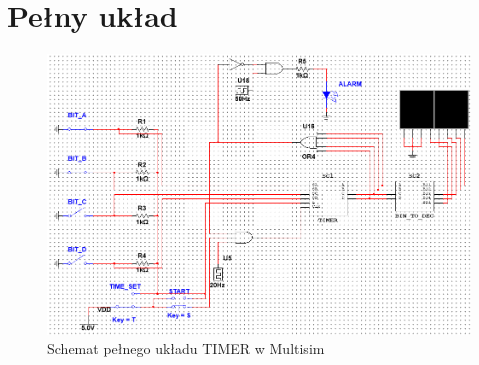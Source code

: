 \documentclass{article}
\begin{document}
    \section{Pełny układ}
    \begin{figure}[H]
        \centering
        \captionsetup{font=small, skip=2pt}
        \includegraphics[scale=0.7]{images/pelny_timer}
        \caption{Schemat pełnego układu TIMER w Multisim}
    \end{figure}
    
    
\end{document}
